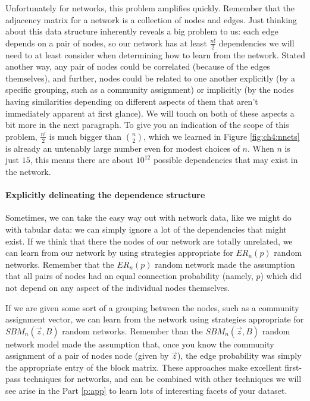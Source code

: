 Unfortunately for networks, this problem amplifies quickly. Remember that the adjacency matrix for a network is a collection of nodes and edges. Just thinking about this data structure inherently reveals a big problem to us: each edge depends on a pair of nodes, so our network has {at least} $\frac{n!}{2}$ dependencies we will need to at least consider when determining how to learn from the network. Stated another way, any pair of nodes could be correlated (because of the edges themselves), and further, nodes could be related to one another explicitly (by a specific grouping, such as a community assignment) or implicitly (by the nodes having similarities depending on different aspects of them that aren't immediately apparent at first glance). We will touch on both of these aspects a bit more in the next paragraph. To give you an indication of the scope of this problem, $\frac{n!}{2}$ is much bigger than $\binom n 2$, which we learned in Figure \ref{fig:ch4:nnets} is already an untenably large number even for modest choices of $n$. When $n$ is just $15$, this means there are about $10^{12}$ possible dependencies that may exist in the network.

\paragraph*{Explicitly delineating the dependence structure}

Sometimes, we can take the easy way out with network data, like we might do with tabular data: we can simply ignore a lot of the dependencies that might exist. If we think that there the nodes of our network are totally unrelated, we can learn from our network by using strategies appropriate for $ER_n(p)$ random networks. Remember that the $ER_n(p)$ random network made the assumption that all pairs of nodes had an equal connection probability (namely, $p$) which did not depend on any aspect of the individual nodes themselves. 

If we are given some sort of a grouping between the nodes, such as a community assignment vector, we can learn from the network using strategies appropriate for $SBM_n(\vec z, B)$ random networks. Remember than the $SBM_n(\vec z, B)$ random network model made the assumption that, once you know the community assignment of a pair of nodes node (given by $\vec z$), the edge probability was simply the appropriate entry of the block matrix. These approaches make excellent first-pass techniques for networks, and can be combined with other techniques we will see arise in the Part \ref{p:app} to learn lots of interesting facets of your dataset.

